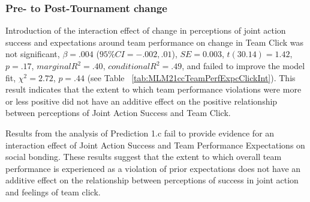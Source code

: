   \subsubsection{Pre- to Post-Tournament change}
  Introduction of the interaction effect of change in perceptions of joint action success and expectations around team performance on change in Team Click was not significant, $\beta = .004$ ($95\% CI =  -.002, .01$), $SE = 0.003$, $t(30.14) = 1.42$, $p = .17$, $marginal R^2 = .40$, $conditional R^2 = .49$, and failed to improve the model fit, $\chi^2 = 2.72$, $ p = .44$ (see Table ~\ref{tab:MLM21ccTeamPerfExpcClickInt}).  This result indicates that the extent to which team performance violations were more or less positive did not have an additive effect on the positive relationship between perceptions of Joint Action Success and Team Click.

  


Results from the analysis of Prediction 1.c fail to provide evidence for an interaction effect of Joint Action Success and Team Performance Expectations on social bonding.  These results suggest that the extent to which overall team performance is experienced as a violation of prior expectations does not have an additive effect on the relationship between perceptions of success in joint action and feelings of team click.

















